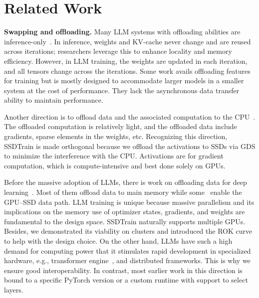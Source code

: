 \section{Related Work}\label{sec:ssdtrain_related}
\noindent
\textbf{Swapping and offloading.} Many LLM systems with offloading abilities are inference-only~\cite{kwonEfficientMemoryManagement2023,shengFlexGenHighThroughputGenerative2023,alizadehLLMFlashEfficient2024}. In inference, weights and KV-cache never change and are reused across iterations; researchers leverage this to enhance locality and memory efficiency. However, in LLM training, the weights are updated in each iteration, and all tensors change across the iterations. Some work avails offloading features~\cite{rajbhandariZeROinfinityBreakingGPU2021} for training but is mostly designed to accommodate larger models in a smaller system at the cost of performance. They lack the asynchronous data transfer ability to maintain performance.

Another direction is to offload data and the associated computation to the CPU~\cite{renZeROOffloadDemocratizingBillionScale2021,kamahoriFiddlerCPUGPUOrchestration2024,songPowerInferFastLarge2023}. The offloaded computation is relatively light, and the offloaded data include gradients, sparse elements in the weights, etc. 
Recognizing this direction, SSDTrain is made orthogonal because we offload the activations to SSDs via GDS to minimize the interference with the CPU. Activations are for gradient computation, which is compute-intensive and best done solely on GPUs. 

Before the massive adoption of LLMs, there is work on offloading data for deep learning~\cite{pengCapuchinTensorbasedGPU2020,wangSuperNeuronsDynamicGPU2018,baeFlashNeuronSSDEnabledLargeBatch2021,rhuVDNNVirtualizedDeep2016,huangSwapAdvisorPushingDeep2020}. Most of them offload data to main memory while some~\cite{baeFlashNeuronSSDEnabledLargeBatch2021} enable the GPU--SSD data path. LLM training is unique because massive parallelism and its implications on the memory use of optimizer states, gradients, and weights are fundamental to the design space. SSDTrain naturally supports multiple GPUs. Besides, we demonstrated its viability on clusters and introduced the ROK curve to help with the design choice. On the other hand, LLMs have such a high demand for computing power that it stimulates rapid development in specialized hardware, e.g., transformer engine~\cite{nvidiaNVIDIAH100Tensor2023}, and distributed frameworks. This is why we ensure good interoperability. In contrast, most earlier work in this direction is bound to a specific PyTorch version or a custom runtime with support to select layers.

